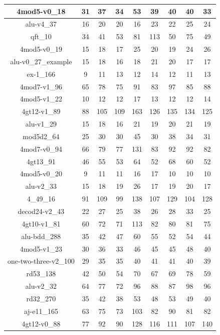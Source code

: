 \begin{longtable}[c]{|c|c|c|c|c|c|c|c|c|}
4mod5-v0\_18 & 31 & 37 & 34 & 53 & 39 & 40 & 40 & 33 \\ \hline
alu-v4\_37 & 16 & 20 & 20 & 16 & 23 & 22 & 25 & 24 \\ \hline
qft\_10 & 34 & 41 & 53 & 81 & 113 & 50 & 75 & 49 \\ \hline
4mod5-v0\_19 & 15 & 18 & 17 & 25 & 20 & 19 & 24 & 26 \\ \hline
alu-v0\_27\_example & 15 & 18 & 16 & 18 & 21 & 20 & 17 & 17 \\ \hline
ex-1\_166 & 9 & 11 & 13 & 12 & 14 & 12 & 11 & 13 \\ \hline
4mod7-v1\_96 & 65 & 78 & 75 & 91 & 83 & 97 & 85 & 88 \\ \hline
4mod5-v1\_22 & 10 & 12 & 12 & 17 & 13 & 12 & 12 & 14 \\ \hline
4gt12-v1\_89 & 88 & 105 & 109 & 163 & 126 & 135 & 134 & 125 \\ \hline
alu-v1\_29 & 15 & 18 & 16 & 21 & 19 & 20 & 21 & 19 \\ \hline
mod5d2\_64 & 25 & 30 & 30 & 45 & 30 & 38 & 34 & 31 \\ \hline
4mod7-v0\_94 & 66 & 79 & 77 & 131 & 83 & 92 & 92 & 82 \\ \hline
4gt13\_91 & 46 & 55 & 53 & 64 & 52 & 68 & 60 & 52 \\ \hline
4mod5-v0\_20 & 9 & 11 & 11 & 16 & 17 & 10 & 10 & 10 \\ \hline
alu-v2\_33 & 15 & 18 & 19 & 26 & 17 & 19 & 20 & 17 \\ \hline
4\_49\_16 & 91 & 109 & 99 & 138 & 107 & 129 & 104 & 128 \\ \hline
decod24-v2\_43 & 22 & 27 & 25 & 38 & 26 & 28 & 33 & 25 \\ \hline
4gt10-v1\_81 & 60 & 72 & 71 & 113 & 82 & 80 & 81 & 75 \\ \hline
alu-bdd\_288 & 35 & 42 & 47 & 60 & 55 & 52 & 54 & 44 \\ \hline
4mod5-v1\_23 & 30 & 36 & 33 & 46 & 45 & 45 & 48 & 40 \\ \hline
one-two-three-v2\_100 & 29 & 35 & 35 & 40 & 41 & 41 & 40 & 39 \\ \hline
rd53\_138 & 42 & 50 & 54 & 70 & 67 & 69 & 78 & 59 \\ \hline
alu-v2\_32 & 64 & 77 & 72 & 96 & 88 & 87 & 98 & 96 \\ \hline
rd32\_270 & 35 & 42 & 38 & 53 & 48 & 53 & 49 & 40 \\ \hline
aj-e11\_165 & 63 & 75 & 73 & 103 & 82 & 90 & 81 & 82 \\ \hline
4gt12-v0\_88 & 77 & 92 & 90 & 128 & 116 & 111 & 107 & 140 \\ \hline

\end{longtable}

